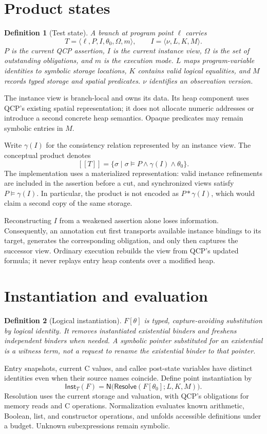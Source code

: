 \documentclass[10pt]{article}
\newcommand{\Inst}{\mathsf{Inst}}
\newcommand{\Norm}{\mathsf{N}}
\newcommand{\sem}[1]{[\![#1]\!]}
\newtheorem{definition}{Definition}
\begin{document}
\section{Product states}
\begin{definition}[Test state]
A branch at program point $\ell$ carries
\[
 T=\langle\ell,P,I,\theta_0,\Omega,m\rangle,
 \qquad I=\langle\nu,L,K,M\rangle.
\]
$P$ is the current QCP assertion, $I$ is the current instance view, $\Omega$ is
the set of outstanding obligations, and $m$ is the execution mode. $L$ maps
program-variable identities to symbolic storage locations, $K$ contains valid
logical equalities, and $M$ records typed storage and spatial predicates.
$\nu$ identifies an observation version.
\end{definition}
The instance view is branch-local and owns its data. Its heap component uses
QCP's existing spatial representation; it does not allocate numeric addresses
or introduce a second concrete heap semantics. Opaque predicates may remain
symbolic entries in $M$.

Write $\gamma(I)$ for the consistency relation represented by an instance
view. The conceptual product denotes
\[
 \sem{T}=\{\sigma\mid\sigma\models P\land\gamma(I)\land\theta_0\}.
\]
The implementation uses a materialized representation: valid instance
refinements are included in the assertion before a cut, and synchronized
views satisfy $P\models\gamma(I)$. In particular, the product is not encoded
as $P*\gamma(I)$, which would claim a second copy of the same storage.

Reconstructing $I$ from a weakened assertion alone loses information.
Consequently, an annotation cut first transports available instance bindings
to its target, generates the corresponding obligation, and only then captures
the successor view. Ordinary execution rebuilds the view from QCP's updated
formula; it never replays entry heap contents over a modified heap.

\section{Instantiation and evaluation}
\begin{definition}[Logical instantiation]
$F[\theta]$ is typed, capture-avoiding substitution by logical identity.
It removes instantiated existential binders and freshens independent binders
when needed. A symbolic pointer substituted for an existential is a witness
term, not a request to rename the existential binder to that pointer.
\end{definition}
Entry snapshots, current C values, and callee post-state variables have distinct
identities even when their source names coincide. Define point instantiation by
\[
 \Inst_T(F)=\Norm\bigl(\mathsf{Resolve}(F[\theta_0];L,K,M)\bigr).
\]
Resolution uses the current storage and valuation, with QCP's obligations for
memory reads and C operations. Normalization evaluates known arithmetic,
Boolean, list, and constructor operations, and unfolds accessible definitions
under a budget. Unknown subexpressions remain symbolic.
\end{document}
